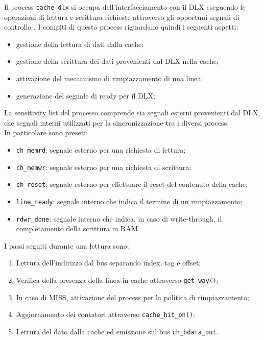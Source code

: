 Il process \texttt{cache\_dlx} si occupa dell'interfacciamento con il DLX eseguendo le operazioni di lettura e scrittura richieste attraverso gli opportuni segnali di controllo .
I compiti di questo process riguardano quindi i seguenti aspetti:
\begin{itemize}
  \item gestione della lettura di dati dalla cache;
  \item gestione della scrittura dei dati provenienti dal DLX nella cache;
  \item attivazione del meccanismo di rimpiazzamento di una linea;
  \item generazione del segnale di ready per il DLX;
\end{itemize}

La sensitivity list del processo comprende sia segnali esterni provenienti dal DLX, che segnali interni utilizzati per la sincronizzazione tra i diversi process.\\
In particolare sono preseti:
\begin{itemize}
  \item \texttt{ch\_memrd}: segnale esterno per una richiesta di lettura;
  \item \texttt{ch\_memwr}: segnale esterno per una richiesta di scrittura;
  \item \texttt{ch\_reset}: segnale esterno per effettuare il reset del contenuto della cache;
  \item \texttt{line\_ready}: segnale interno che indica il termine di un rimpiazzamento;
  \item \texttt{rdwr\_done}: segnale interno che indica, in caso di write-through, il completamento della scrittura in RAM.
\end{itemize}
 
I passi seguiti durante una lettura sono:
\begin{enumerate}
  \item Lettura dell'indirizzo dal bus separando index, tag e offset;
  \item Verifica della presenza della linea in cache attraverso \texttt{get\_way()};
  \item In caso di MISS, attivazione del process per la politica di rimpiazzamento;
  \item Aggiornamento dei contatori attraverso \texttt{cache\_hit\_on()};
  \item Lettura del dato dalla cache ed emissione sul bus \texttt{ch\_bdata\_out}.
\end{enumerate}	

